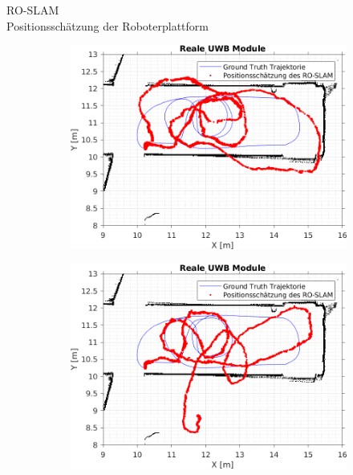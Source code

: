 \documentclass{beamer}
\begin{document}
%
%
\begin{frame}{RO-SLAM\\\normalsize{Positionsschätzung der Roboterplattform}}

	\begin{figure}
		\centering
		\begin{subfigure}{0.41\linewidth}
			\centering
			\includegraphics[width=\linewidth]{Record_2018-02-08-12-33-53_filtered_3_trajectory_pf}
		\end{subfigure}
		\hfill
		\begin{subfigure}{0.41\linewidth}
			\centering
			\includegraphics[width=\linewidth]{Record_2018-02-08-12-33-53_filtered_1_trajectory_pf}

\end{subfigure}
\end{figure}
\end{frame}
\end{document}
